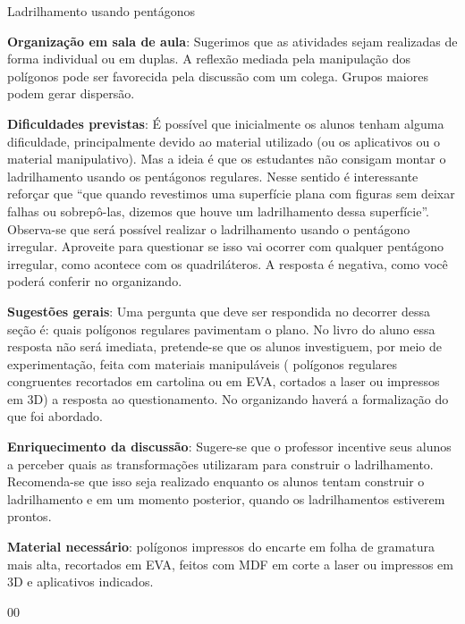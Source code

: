 \begin{sugestions}{Ladrilhamento usando pentágonos}
{
\textbf{Organização em sala de aula}: Sugerimos que as atividades sejam realizadas de forma individual ou em duplas. A reflexão mediada pela manipulação dos polígonos pode ser favorecida pela discussão com um colega. Grupos maiores podem gerar dispersão.

\textbf{Dificuldades previstas}: É possível que inicialmente os alunos tenham alguma dificuldade, principalmente devido ao material utilizado (ou os aplicativos ou o material manipulativo). Mas a ideia é que os estudantes não consigam  montar o ladrilhamento usando os pentágonos regulares. Nesse sentido é interessante reforçar que “que quando revestimos uma superfície plana com figuras sem deixar falhas ou sobrepô-las, dizemos que houve um ladrilhamento dessa superfície”. Observa-se que será possível realizar o ladrilhamento usando o pentágono irregular. Aproveite para questionar se isso vai ocorrer com qualquer pentágono irregular, como acontece com os quadriláteros. A resposta é negativa, como você poderá conferir no organizando. 

\textbf{Sugestões gerais}: Uma pergunta que deve ser respondida no decorrer dessa seção é: quais polígonos regulares pavimentam o plano. No livro do aluno essa resposta não será imediata, pretende-se que os alunos investiguem, por meio de experimentação, feita com materiais manipuláveis ( polígonos regulares congruentes recortados em cartolina ou em EVA, cortados a laser ou impressos em 3D) a resposta ao questionamento. No organizando haverá a formalização do que foi abordado.  

\textbf{Enriquecimento da discussão}: Sugere-se que o professor incentive seus alunos a perceber quais as transformações utilizaram para construir o ladrilhamento. Recomenda-se que isso seja realizado enquanto os alunos tentam construir o ladrilhamento e em um momento posterior, quando os ladrilhamentos estiverem prontos.

\textbf{Material necessário}: polígonos impressos do encarte em folha de gramatura mais alta, recortados em EVA, feitos com MDF em corte a laser ou impressos em 3D e aplicativos indicados.
}{0}{0}
\end{sugestions}
